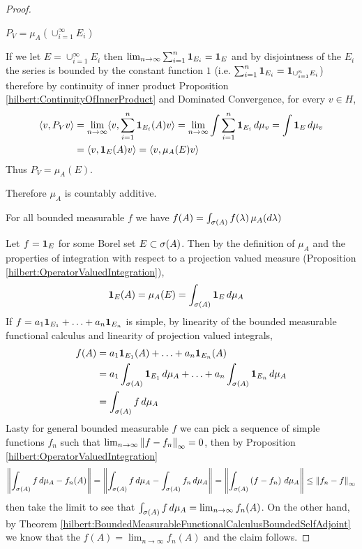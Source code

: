 \begin{proof}
\begin{clm} $P_V = \mu_A(\cup_{i=1}^\infty E_i)$
\end{clm}
If we let $E = \cup_{i=1}^\infty E_i$ then $\lim_{n \to \infty} \sum_{i=1}^n \textbf{1}_{E_i} = \textbf{1}_{E}$ and by disjointness of the $E_i$ the series is bounded by the constant function $1$ (i.e. $\sum_{i=1}^n \textbf{1}_{E_i}  = \textbf{1}_{\cup_{i=1}^n E_i}$) therefore by continuity of inner product Proposition \ref{hilbert:ContinuityOfInnerProduct} and Dominated Convergence, for every $v \in H$,
\begin{align*}
\langle v, P_V v \rangle &= \lim_{n \to \infty} \langle v, \sum_{i=1}^n \textbf{1}_{E_i}(A) v \rangle = \lim_{n \to \infty} \int \sum_{i=1}^n \textbf{1}_{E_i} \, d\mu_v = \int \textbf{1}_{E} \, d\mu_v \\
&= \langle v, \textbf{1}_{E}(A) v \rangle = \langle v, \mu_A(E) v \rangle 
\end{align*}
Thus $P_V = \mu_A(E)$.

Therefore $\mu_A$ is countably additive.  

\begin{clm} For all bounded measurable $f$ we have $f(A) = \int_{\sigma(A)} f(\lambda)  \, \mu_A(d\lambda)$
\end{clm}
Let $f = \textbf{1}_{E}$ for some Borel set $E \subset
\sigma(A)$.  Then by the definition of $\mu_A$ and the properties of
integration with respect to a projection valued measure (Proposition \ref{hilbert:OperatorValuedIntegration}),
\begin{align*}
\textbf{1}_{E}(A) &= \mu_A(E) = \int_{\sigma(A)} \textbf{1}_{E} \, d\mu_A
\end{align*}
If  $f = a_1 \textbf{1}_{E_1} + \dotsc +  a_n \textbf{1}_{E_n}$ is simple, by linearity of the bounded measurable 
functional calculus and linearity of projection valued integrals,
\begin{align*}
f(A) &= a_1 \textbf{1}_{E_1}(A) + \dotsc +  a_n \textbf{1}_{E_n}(A) \\
     &= a_1 \int_{\sigma(A)} \textbf{1}_{E_1} \, d\mu_A + \dotsc + a_n \int_{\sigma(A)} \textbf{1}_{E_n} \, d\mu_A \\
     &= \int_{\sigma(A)} f \, d\mu_A \\
\end{align*}
Lasty for general bounded measurable $f$ we can pick a sequence of
simple functions $f_n$ such that $\lim_{n \to \infty} \left \lVert f -  f_n \right \rVert_\infty = 0$, then by Proposition \ref{hilbert:OperatorValuedIntegration}
\begin{align*}
  \left \lVert  \int_{\sigma(A)} f \, d\mu_A - f_n(A) \right \rVert
  = \left \lVert  \int_{\sigma(A)} f \, d\mu_A - \int_{\sigma(A)} f_n \, d\mu_A \right \rVert
  =  \left \lVert  \int_{\sigma(A)} \left(f - f_n\right) \, d\mu_A \right \rVert \leq \left \lVert f_n - f \right \rVert_\infty
\end{align*}
then take the limit to see that $\int_{\sigma(A)} f \, d\mu_A = \lim_{n \to \infty} f_n(A)$.   On the other hand, by
Theorem \ref{hilbert:BoundedMeasurableFunctionalCalculusBoundedSelfAdjoint} we know that the $f(A) = \lim_{n \to \infty} f_n(A)$
and the claim follows.


\end{proof}
